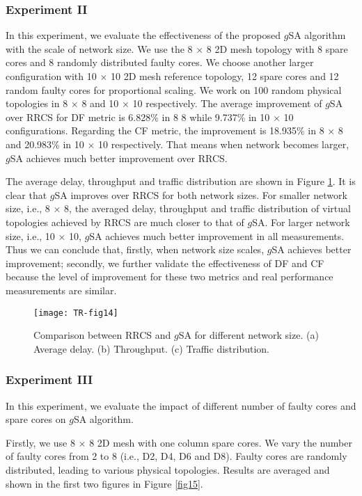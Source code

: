 \subsubsection{Experiment II}

In this experiment, we evaluate the effectiveness of the proposed  $g$SA algorithm with the scale of network size. We use the 8 $\times$ 8 2D mesh topology with 8 spare cores and 8 randomly distributed faulty cores. We choose another larger configuration with 10 $\times$ 10 2D mesh reference topology, 12 spare cores and 12 random faulty cores for proportional scaling. We work on 100 random physical topologies in 8 $\times$ 8 and 10 $\times$ 10 respectively. The average improvement of $g$SA over RRCS for DF metric is 6.828\% in 8 8 while 9.737\% in 10 $\times$ 10 configurations. Regarding the CF metric, the improvement is 18.935\% in 8 $\times$ 8 and 20.983\% in 10 $\times$ 10 respectively. That means when network becomes larger, $g$SA achieves much better improvement over RRCS.


The average delay, throughput and traffic distribution are shown in Figure \ref{fig14}. It is clear that $g$SA improves over RRCS for both network sizes. For smaller network size, i.e., 8 $\times$ 8, the averaged delay, throughput and traffic distribution of virtual topologies achieved by RRCS are much closer to that of $g$SA. For larger network size, i.e., 10 $\times$ 10, $g$SA achieves much better improvement in all measurements. Thus we can conclude that, firstly, when network size scales, $g$SA achieves better improvement; secondly, we further validate the effectiveness of DF and CF because the level of improvement for these two metrics and real performance measurements are similar.

\begin{figure}[h]
      \centering
        \texttt{[image: TR-fig14]}
          \caption{ Comparison between RRCS and $g$SA for different network size. (a) Average delay. (b) Throughput. (c) Traffic distribution.}
        \label{fig14}
\end{figure}


\subsubsection{Experiment III}

In this experiment, we evaluate the impact of different number of faulty cores and spare cores on $g$SA algorithm.

Firstly, we use 8 $\times$ 8 2D mesh with one column spare cores. We vary the number of faulty cores from 2 to 8 (i.e., D2, D4, D6 and D8). Faulty cores are randomly distributed, leading to various physical topologies. Results are averaged and shown in the first two figures in Figure \ref{fig15}.

